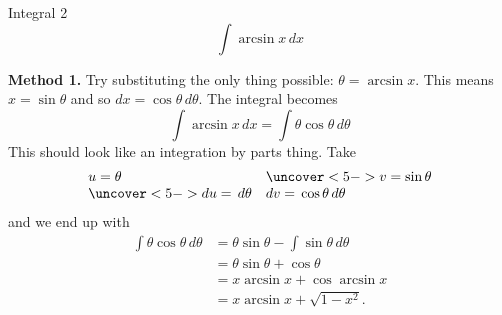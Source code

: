\documentclass{beamer}
\begin{document}
\begin{frame}
  \begin{block}{Integral 2}
    \begin{displaymath}
      \int \arcsin x \, dx
    \end{displaymath}
  \end{block}
  \pause
  \textbf{Method 1.} Try substituting the only thing possible: $ \theta = \arcsin x $. This means $ x = \sin \theta $
  and so $ dx = \cos \theta \, d\theta $.  \pause The integral becomes
  \begin{displaymath}
    \int \arcsin x \, dx = \int \theta \cos \theta \, d\theta
  \end{displaymath}
  \pause
  This should look like an integration by parts thing. Take
  \begin{displaymath}
    \begin{array}{ll}
      u = \theta & \uncover<5->{v = \sin\theta}\\
      \uncover<5->{du = \, d\theta} & dv = \, \cos\theta \, d\theta
    \end{array}
  \end{displaymath}\pause\pause
  and we end up with
  \begin{align*}
    \int \theta \cos \theta \, d\theta &= \theta \sin \theta - \int \sin \theta \, d\theta\\
                                       &= \theta \sin \theta + \cos \theta\\
                                       &= x \arcsin x + \cos \arcsin x\\
                                       &= x \arcsin x + \sqrt{1-x^2}.
  \end{align*}
\end{frame}
\end{document}

